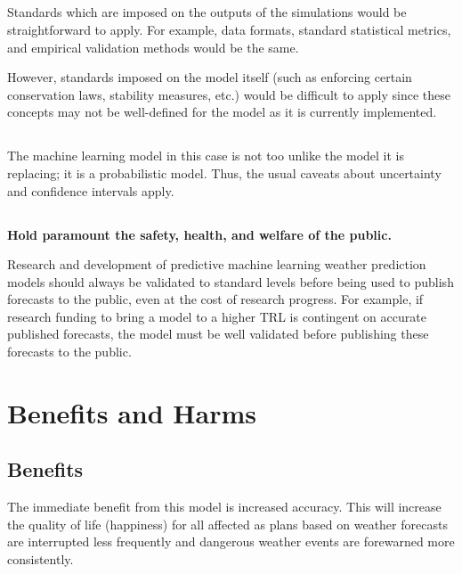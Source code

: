 \documentclass[11pt]{article}
\begin{document}
\subsection{} %
Standards which are imposed on the outputs of the simulations would be
straightforward to apply. For example, data formats, standard statistical
metrics, and empirical validation methods would be the same.

However, standards imposed on the model itself (such as enforcing certain
conservation laws, stability measures, etc.) would be difficult to apply since
these concepts may not be well-defined for the model as it is currently
implemented.

\subsection{} %
The machine learning model in this case is not too unlike the model it is
replacing; it is a probabilistic model. Thus, the usual caveats about
uncertainty and confidence intervals apply.

\subsection{} %
\textbf{Hold paramount the safety, health, and welfare of the public.}

Research and development of predictive machine learning weather prediction
models should always be validated to standard levels before being used to
publish forecasts to the public, even at the cost of research progress. For
example, if research funding to bring a model to a higher TRL is contingent on
accurate published forecasts, the model must be well validated before publishing
these forecasts to the public.

\section{Benefits and Harms}

\subsection*{Benefits} %
The immediate benefit from this model is increased accuracy. This will increase
the quality of life (happiness) for all affected as plans based on weather
forecasts are interrupted less frequently and dangerous weather events are
forewarned more consistently.
\end{document}
